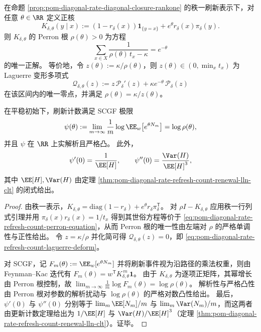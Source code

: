 \begin{theorem}\label{thm:pom-diagonal-rate-refresh-count-scgf-laguerre}
在命题 \ref{prop:pom-diagonal-rate-diagonal-closure-rankone} 的秩一刷新表示下，对任意 \(\theta\in\RR\) 定义正核
\[
K_{\delta,\theta}(y\mid x):=(1-r_\delta(x))\mathbf 1_{\{y=x\}}+e^{\theta}r_\delta(x)\pi_\delta(y).
\]
则 \(K_{\delta,\theta}\) 的 Perron 根 \(\rho(\theta)>0\) 为方程
\begin{equation}\label{eq:pom-diagonal-rate-refresh-count-perron-equation}
\boxed{\;
\sum_{x\in X}\frac{1}{\rho(\theta)\,t_x-\kappa}=e^{-\theta}\;}
\end{equation}
的唯一正解。
等价地，令 \(z(\theta):=\kappa/\rho(\theta)\)，则 \(z(\theta)\in(0,\min_x t_x)\) 为 Laguerre 变形多项式
\begin{equation}\label{eq:pom-diagonal-rate-refresh-count-laguerre-deform}
\boxed{\;
\mathcal Q_{\delta,\theta}(z):=z\,\mathcal P_\delta'(z)+\kappa e^{-\theta}\,\mathcal P_\delta(z)\;}
\end{equation}
在该区间内的唯一零点，并满足 \(\rho(\theta)=\kappa/z(\theta)\)。
\par
在平稳初始下，刷新计数满足 SCGF 极限
\[
\psi(\theta):=\lim_{m\to\infty}\frac{1}{m}\log\EE_w\bigl[e^{\theta N_m}\bigr]=\log\rho(\theta),
\]
并且 \(\psi\) 在 \(\RR\) 上实解析且严格凸。
此外，
\[
\psi'(0)=\frac{1}{\EE[H]},
\qquad
\psi''(0)=\frac{\Var(H)}{\EE[H]^3},
\]
其中 \(\EE[H],\Var(H)\) 由定理 \ref{thm:pom-diagonal-rate-refresh-count-renewal-lln-clt} 的闭式给出。
\end{theorem}
\begin{proof}
由秩一表示，\(K_{\delta,\theta}=\mathrm{diag}(1-r_\delta)+e^{\theta}r_\delta\pi_\delta^{\mathsf T}\)。
对 \(\rho I-K_{\delta,\theta}\) 应用秩一行列式引理并用
\(
\pi_\delta(x)r_\delta(x)=1/t_x
\)
得到其世俗方程等价于 \eqref{eq:pom-diagonal-rate-refresh-count-perron-equation}，从而 Perron 根的唯一性由左端对 \(\rho\) 的严格单调性与正性给出。
令 \(z=\kappa/\rho\) 并化简可得 \(\mathcal Q_{\delta,\theta}(z)=0\)，即 \eqref{eq:pom-diagonal-rate-refresh-count-laguerre-deform}。
\par
对 SCGF，记
\(
F_m(\theta):=\EE_w[e^{\theta N_m}]
\)
并将刷新事件视为沿路径的乘法权重，则由 Feynman--Kac 迭代有
\(
F_m(\theta)=w^{\mathsf T}K_{\delta,\theta}^{\,m}\mathbf 1
\)。
由于 \(K_{\delta,\theta}\) 为逐项正矩阵，其幂增长由 Perron 根控制，故
\(
\lim_{m\to\infty}\frac{1}{m}\log F_m(\theta)=\log\rho(\theta)
\)。
解析性与严格凸性由 Perron 根对参数的解析扰动与 \(\log\rho(\theta)\) 的严格对数凸性给出。
最后，\(\psi'(0)\) 与 \(\psi''(0)\) 分别等于 \(\lim_m \EE[N_m]/m\) 与 \(\lim_m\Var(N_m)/m\)，而这两者由更新计数定理给出为 \(1/\EE[H]\) 与 \(\Var(H)/\EE[H]^3\)（定理 \ref{thm:pom-diagonal-rate-refresh-count-renewal-lln-clt}）。证毕。
\end{proof}

